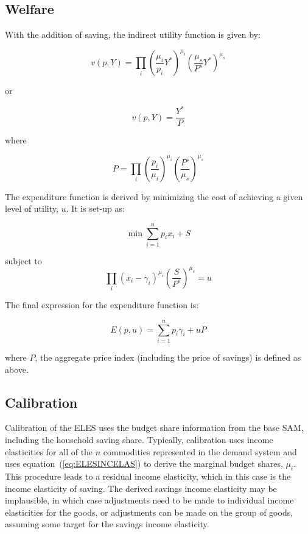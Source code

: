 \subsection{Welfare}

With the addition of saving, the indirect utility function is given by:

\begin{equation}
\label{eq:ELESINDU}
v(p,Y) = \prod\limits_i { \left( \frac {\mu_i} {p_i} {Y^*} \right)^{\mu _i}}
   \left( \frac {\mu_s} {P^s} {Y^*} \right)^{\mu _s}
\end{equation}

\noindent or

\begin{equation}
\label{eq:ELESINDU2}
v(p,Y) = \frac{Y^*}{P}
\end{equation}

\noindent where

\[
P = \prod\limits_i {\left( \frac{p_i}{\mu_i} \right)^{\mu _i} }
   \left( \frac{P^s}{\mu _s} \right)^{\mu _s}
\]

The expenditure function is derived by minimizing the cost of achieving a given level of
utility, $u$. It is set-up as:

\[\min \sum\limits_{i = 1}^n {{p_i}{x_i}}  + S\]

\noindent subject to
\[
\prod\limits_i {\left( x_i - \gamma _i \right)^{\mu _i}}
   \left( \frac {S} {P^s} \right)^{\mu _s} = u
\]

\noindent The final expression for the expenditure function is:

\begin{equation}
\label{eq:ELESEXP}
   E\left( p,u \right) = \sum\limits_{i = 1}^n {{p_i}{\gamma _i}}  + uP
\end{equation}

\noindent where $P$, the aggregate price index (including the price of savings) is defined
as above.

\subsection{Calibration}

Calibration of the ELES uses the budget share information from the base SAM, including the
household saving share. Typically, calibration uses income elasticities for all of the $n$
commodities represented in the demand system and uses equation~(\ref{eq:ELESINCELAS}) to derive
the marginal budget shares, $\mu_i$. This procedure leads to a residual income elasticity, which
in this case is the income elasticity of saving. The derived savings income elasticity may be
implausible, in which case adjustments need to be made to individual income elasticities for the
goods, or adjustments can be made on the group of goods, assuming some target for the savings
income elasticity.

